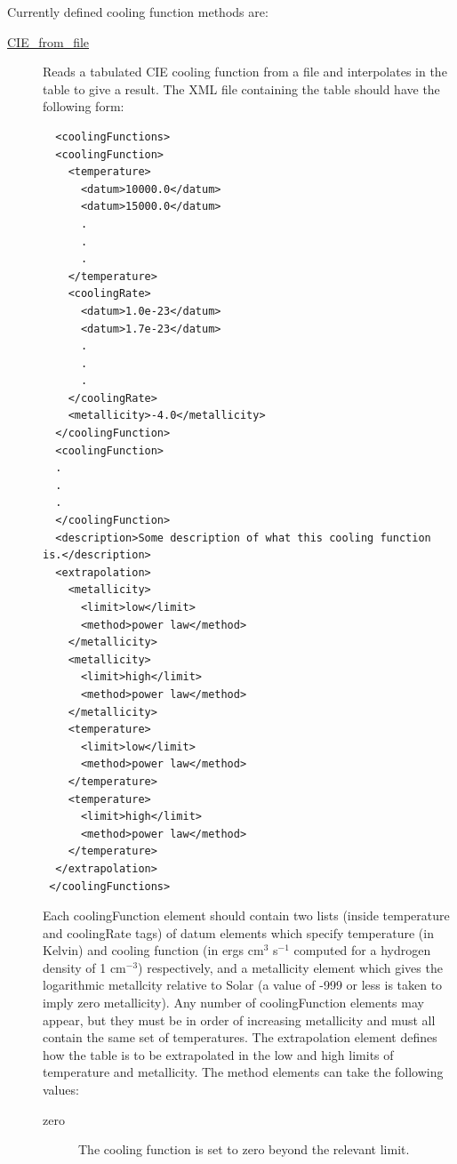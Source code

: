 Currently defined cooling function methods are:
\begin{description}
 \item [\hyperlink{cooling.cooling_function.CIE_file.F90:cooling_functions_cie_file:cooling_function_cie_file}{{\normalfont \ttfamily CIE\_from\_file}}] Reads a tabulated CIE cooling function from a file and interpolates in the table to give a result. The XML file containing the table should have the following form:
 \begin{verbatim}
  <coolingFunctions>
  <coolingFunction>
    <temperature>
      <datum>10000.0</datum>
      <datum>15000.0</datum>
      .
      .
      .
    </temperature>
    <coolingRate>
      <datum>1.0e-23</datum>
      <datum>1.7e-23</datum>
      .
      .
      .
    </coolingRate>
    <metallicity>-4.0</metallicity>
  </coolingFunction>
  <coolingFunction>
  .
  .
  .
  </coolingFunction>
  <description>Some description of what this cooling function is.</description>
  <extrapolation>
    <metallicity>
      <limit>low</limit>
      <method>power law</method>
    </metallicity>
    <metallicity>
      <limit>high</limit>
      <method>power law</method>
    </metallicity>
    <temperature>
      <limit>low</limit>
      <method>power law</method>
    </temperature>
    <temperature>
      <limit>high</limit>
      <method>power law</method>
    </temperature>
  </extrapolation>
 </coolingFunctions>
 \end{verbatim}
 Each {\normalfont \ttfamily coolingFunction} element should contain two lists (inside {\normalfont \ttfamily temperature} and {\normalfont \ttfamily coolingRate} tags) of {\normalfont \ttfamily datum} elements which specify temperature (in Kelvin) and cooling function (in ergs cm$^3$ s$^{-1}$ computed for a hydrogen density of 1 cm$^{-3}$) respectively, and a {\normalfont \ttfamily metallicity} element which gives the logarithmic metallcity relative to Solar (a value of -999 or less is taken to imply zero metallicity). Any number of {\normalfont \ttfamily coolingFunction} elements may appear, but they must be in order of increasing metallicity and must all contain the same set of temperatures. The {\normalfont \ttfamily extrapolation} element defines how the table is to be extrapolated in the {\normalfont \ttfamily low} and {\normalfont \ttfamily high} limits of {\normalfont \ttfamily temperature} and {\normalfont \ttfamily metallicity}. The {\normalfont \ttfamily method} elements can take the following values:
 \begin{description}
  \item[{\normalfont \ttfamily zero}] The cooling function is set to zero beyond the relevant limit.

\end{description}
\end{description}

